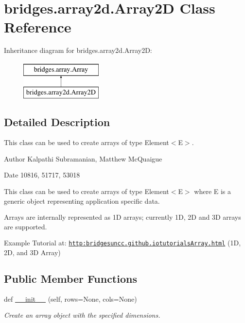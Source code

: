 \hypertarget{classbridges_1_1array2d_1_1_array2_d}{}\section{bridges.\+array2d.\+Array2D Class Reference}
\label{classbridges_1_1array2d_1_1_array2_d}
Inheritance diagram for bridges.\+array2d.\+Array2D\+:\begin{figure}[H]
\begin{center}
\leavevmode
\includegraphics[height=2.000000cm]{classbridges_1_1array2d_1_1_array2_d}
\end{center}
\end{figure}


\subsection{Detailed Description}
This class can be used to create arrays of type Element$<$\+E$>$. 

\begin{DoxyAuthor}{Author}
Kalpathi Subramanian, Matthew Mc\+Quaigue
\end{DoxyAuthor}
\begin{DoxyDate}{Date}
10816, 51717, 53018
\end{DoxyDate}
This class can be used to create arrays of type Element$<$\+E$>$ where E is a generic object representing application specific data.

Arrays are internally represented as 1D arrays; currently 1D, 2D and 3D arrays are supported.

Example Tutorial at\+: \href{http:bridgesuncc.github.iotutorialsArray.html}{\tt http\+:bridgesuncc.\+github.\+iotutorials\+Array.\+html} (1D, 2D, and 3D Array)~\newline
 \subsection*{Public Member Functions}
\begin{DoxyCompactItemize}
\item 
def \hyperlink{classbridges_1_1array2d_1_1_array2_d_a8e55f66ed3e8b4f9dd0a6eac578d8c07}{\+\_\+\+\_\+init\+\_\+\+\_\+} (self, rows=None, cols=None)
\begin{DoxyCompactList}\small\item\em Create an array object with the specified dimensions. \end{DoxyCompactList}\end{DoxyCompactItemize}
